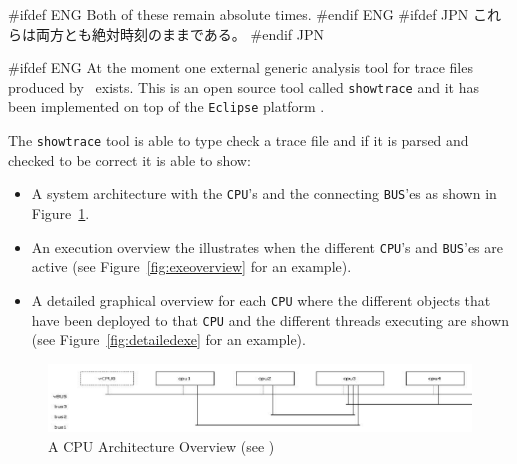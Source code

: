\documentclass[\pformat,12pt]{article}
\begin{document}
#ifdef ENG
Both of these remain absolute times.
#endif ENG
#ifdef JPN
これらは両方とも絶対時刻のままである。
#endif JPN

#ifdef ENG
At the moment one external generic analysis tool for trace files produced by
\VDMTools\ exists. This is an open source tool called \texttt{showtrace} and
it has been implemented on top of the \texttt{Eclipse} platform 
\cite{Carlson05}. 

The \texttt{showtrace} tool is able to type check a trace file and if it 
is parsed and checked to be correct it is able to show:

\begin{itemize}
\item A system architecture with the \texttt{CPU}'s and the connecting
      \texttt{BUS}'es as shown in Figure~\ref{fig:cpuarchitecture}.
\item An execution overview the illustrates when the different 
      \texttt{CPU}'s and \texttt{BUS}'es are active (see 
      Figure~\ref{fig:exeoverview} for an example).
\item A detailed graphical overview for each \texttt{CPU} where the
      different objects that have been deployed to that \texttt{CPU} and
      the different threads executing are shown (see 
      Figure~\ref{fig:detailedexe} for an example).
\end{itemize}

\begin{figure}
\begin{center}
\includegraphics[width=\textwidth]{cpuarchitecture.png}
\end{center}
\caption{A CPU Architecture Overview (see \cite{VICEGuide-SCSK})
\label{fig:cpuarchitecture}}
\end{figure}
\end{document}
